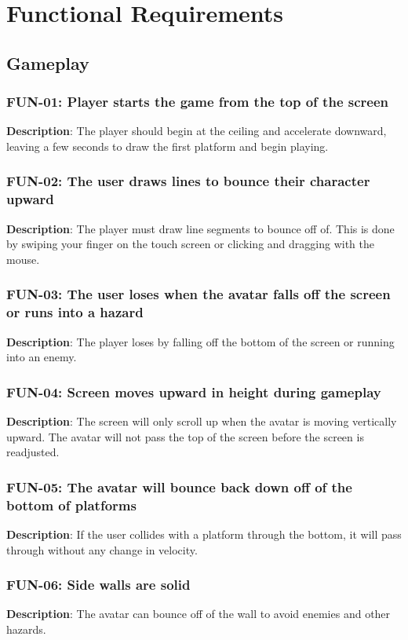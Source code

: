 \chapter{Functional Requirements}
\section{Gameplay}
\subsection{FUN-01: Player starts the game from the top of the screen}
\textbf{Description}: The player should begin at the ceiling and accelerate
downward, leaving a few seconds to draw the first platform and begin
playing.

\subsection{FUN-02: The user draws lines to bounce their character upward}
\textbf{Description}: The player must draw line segments to bounce
off of. This is done by swiping your finger on the touch screen or
clicking and dragging with the mouse.

\subsection{FUN-03: The user loses when the avatar falls off the screen or runs
into a hazard}
\textbf{Description}: The player loses by falling off the bottom of
the screen or running into an enemy.

\subsection{FUN-04: Screen moves upward in height during gameplay}
\textbf{Description}: The screen will only scroll up when the avatar
is moving vertically upward. The avatar will not pass the top of the
screen before the screen is readjusted.

\subsection{FUN-05: The avatar will bounce back down off of the bottom of platforms}
\textbf{Description}: If the user collides with a platform through
the bottom, it will pass through without any change in velocity.

\subsection{FUN-06: Side walls are solid}
\textbf{Description}: The avatar can bounce off of the wall to avoid enemies and other hazards.

